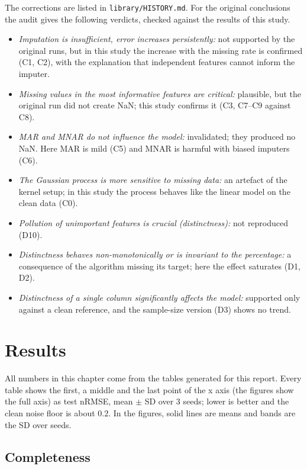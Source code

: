 \documentclass{Configuration_Files/PoliMi3i_thesis}
\begin{document}
The corrections are listed in \texttt{library/HISTORY.md}. For the original conclusions the audit gives the following verdicts, checked against the results of this study.
\begin{itemize}
    \item \emph{Imputation is insufficient, error increases persistently:} not supported by the original runs, but in this study the increase with the missing rate is confirmed (C1, C2), with the explanation that independent features cannot inform the imputer.
    \item \emph{Missing values in the most informative features are critical:} plausible, but the original run did not create NaN; this study confirms it (C3, C7--C9 against C8).
    \item \emph{MAR and MNAR do not influence the model:} invalidated; they produced no NaN. Here MAR is mild (C5) and MNAR is harmful with biased imputers (C6).
    \item \emph{The Gaussian process is more sensitive to missing data:} an artefact of the kernel setup; in this study the process behaves like the linear model on the clean data (C0).
    \item \emph{Pollution of unimportant features is crucial (distinctness):} not reproduced (D10).
    \item \emph{Distinctness behaves non-monotonically or is invariant to the percentage:} a consequence of the algorithm missing its target; here the effect saturates (D1, D2).
    \item \emph{Distinctness of a single column significantly affects the model:} supported only against a clean reference, and the sample-size version (D3) shows no trend.
\end{itemize}

\chapter{Results}
\label{ch:chapter_4}%
All numbers in this chapter come from the tables generated for this report. Every table shows the first, a middle and the last point of the x axis (the figures show the full axis) as test nRMSE, mean $\pm$ SD over 3 seeds; lower is better and the clean noise floor is about $0.2$. In the figures, solid lines are means and bands are the SD over seeds.

\section{Completeness}
\label{sec:res_completeness}%
\end{document}
